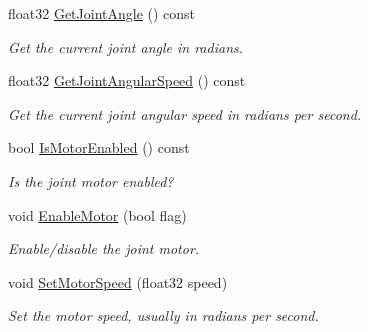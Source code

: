 \begin{DoxyCompactItemize}
\mbox{\label{classb2WheelJoint_a3ea115dde9bad34d23fd59068734824a}} 
float32 \mbox{\hyperlink{classb2WheelJoint_a3ea115dde9bad34d23fd59068734824a}{Get\+Joint\+Angle}} () const
\begin{DoxyCompactList}\small\item\em Get the current joint angle in radians. \end{DoxyCompactList}\item 
\mbox{\label{classb2WheelJoint_aaf5a4e3713ceca98c2afda950e67ff9d}} 
float32 \mbox{\hyperlink{classb2WheelJoint_aaf5a4e3713ceca98c2afda950e67ff9d}{Get\+Joint\+Angular\+Speed}} () const
\begin{DoxyCompactList}\small\item\em Get the current joint angular speed in radians per second. \end{DoxyCompactList}\item 
\mbox{\label{classb2WheelJoint_aef7948a18ec2784397a1d3745824cd78}} 
bool \mbox{\hyperlink{classb2WheelJoint_aef7948a18ec2784397a1d3745824cd78}{Is\+Motor\+Enabled}} () const
\begin{DoxyCompactList}\small\item\em Is the joint motor enabled? \end{DoxyCompactList}\item 
\mbox{\label{classb2WheelJoint_a7a832d814bdda135a78fad41ba671da6}} 
void \mbox{\hyperlink{classb2WheelJoint_a7a832d814bdda135a78fad41ba671da6}{Enable\+Motor}} (bool flag)
\begin{DoxyCompactList}\small\item\em Enable/disable the joint motor. \end{DoxyCompactList}\item 
\mbox{\label{classb2WheelJoint_a6e3255fcf5c82b979ad7e3dc1c089c0b}} 
void \mbox{\hyperlink{classb2WheelJoint_a6e3255fcf5c82b979ad7e3dc1c089c0b}{Set\+Motor\+Speed}} (float32 speed)
\begin{DoxyCompactList}\small\item\em Set the motor speed, usually in radians per second. \end{DoxyCompactList}\item 
\mbox{\label{classb2WheelJoint_a47774ba5dfc1a6a5f15bcc651eea8127}} 

\end{DoxyCompactItemize}
